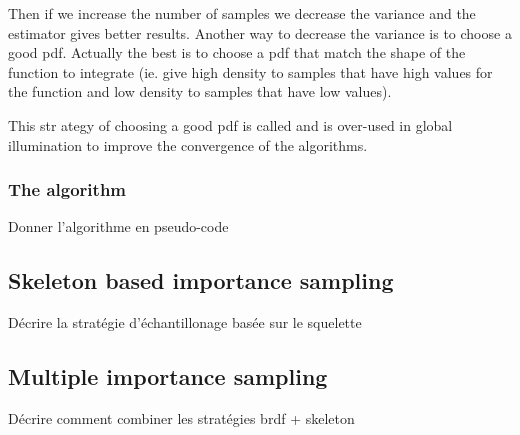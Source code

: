 Then if we increase the number of samples we decrease the variance and the estimator gives better results. Another way to decrease the variance is to choose a good pdf. Actually the best is to choose a pdf that match the shape of the function to integrate (ie. give high density to samples that have high values for the function and low density to samples that have low values).

This str	ategy of choosing a good pdf is called  and is over-used in global illumination to improve the convergence of the algorithms.

\subsubsection{The algorithm}

Donner l'algorithme en pseudo-code

\subsection{Skeleton based importance sampling}

Décrire la stratégie d'échantillonage basée sur le squelette

\subsection{Multiple importance sampling}

Décrire comment combiner les stratégies brdf + skeleton
